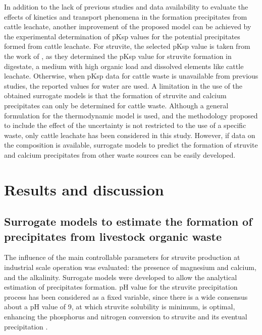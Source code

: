 \documentclass[10pt,a4paper]{article}
\begin{document}
In addition to the lack of previous studies and data availability to evaluate the effects of kinetics and transport phenomena in the formation precipitates from cattle leachate, another improvement of the proposed model can be achieved by the experimental determination of pKsp values for the potential precipitates formed from cattle leachate. For struvite, the selected pKsp value is taken from the work of , as they determined the pKsp value for struvite formation in digestate, a medium with high organic load and dissolved elements like cattle leachate. Otherwise, when pKsp data for cattle waste is unavailable from previous studies, the reported values for water are used. A limitation in the use of the obtained surrogate models is that the formation of struvite and calcium precipitates can only be determined for cattle waste. Although a general formulation for the thermodynamic model is used, and the methodology proposed to include the effect of the uncertainty is not restricted to the use of a specific waste, only cattle leachate has been considered in this study. However, if data on the composition is available, surrogate models to predict the formation of struvite and calcium precipitates from other waste sources can be easily developed.

\section{Results and discussion}
\subsection{Surrogate models to estimate the formation of precipitates from livestock organic waste} \label{results}
The influence of the main controllable parameters for struvite production at industrial scale operation was evaluated: the presence of magnesium and calcium, and the alkalinity. Surrogate models were developed to allow the analytical estimation of precipitates formation. pH value for the struvite precipitation process has been considered as a fixed variable, since there is a wide consensus about a pH value of 9, at which struvite solubility is minimum, is optimal, enhancing the phosphorus and nitrogen conversion to struvite and its eventual precipitation .
\end{document}
